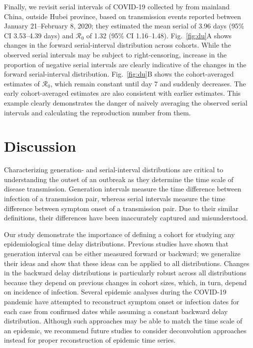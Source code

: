 \documentclass[12pt]{article}
\newcommand{\fref}[1]{Fig.~\ref{fig:#1}}
\begin{document}
Finally, we revisit serial intervals of COVID-19 collected by \cite{du2020serial} from mainland China, outside Hubei province, based on transmission events reported between January 21--February 8, 2020;
they estimated the mean serial of 3.96 days (95\% CI 3.53–4.39 days) and $\mathcal R_0$ of 1.32 (95\% CI 1.16–1.48).
\fref{du}A shows changes in the forward serial-interval distribution across cohorts.
While the observed serial intervals may be subject to right-censoring, increase in the proportion of negative serial intervals are clearly indicative of the changes in the forward serial-interval distribution.
\fref{du}B shows the cohort-averaged estimates of $\mathcal R_0$, which remain constant until day 7 and suddenly decreases.
The early cohort-averaged estimates are also consistent with earlier estimates.
This example clearly demonstrates the danger of naively averaging the observed serial intervals and calculating the reproduction number from them.

\section{Discussion}

Characterizing generation- and serial-interval distributions are critical to understanding the outset of an outbreak as they determine the time scale of disease transmission.
Generation intervals measure the time difference between infection of a transmission pair, whereas serial intervals measure the time difference between symptom onset of a transmission pair.
Due to their similar definitions, their differences have been inaccurately captured and misunderstood.

Our study demonstrate the importance of defining a cohort for studying any epidemiological time delay distributions.
Previous studies have shown that generation interval can be either measured forward or backward;
we generalize their ideas and show that these ideas can be applied to all distributions.
Changes in the backward delay distributions is particularly robust across all distributions because they depend on previous changes in cohort sizes, which, in turn, depend on incidence of infection.
Several epidemic analyses during the COVID-19 pandemic have attempted to reconstruct symptom onset or infection dates for each case from confirmed dates while assuming a constant backward delay distribution.
Although such approaches may be able to match the time scale of an epidemic, we recommend future studies to consider deconvolution approaches instead for proper reconstruction of epidemic time series.
\end{document}

